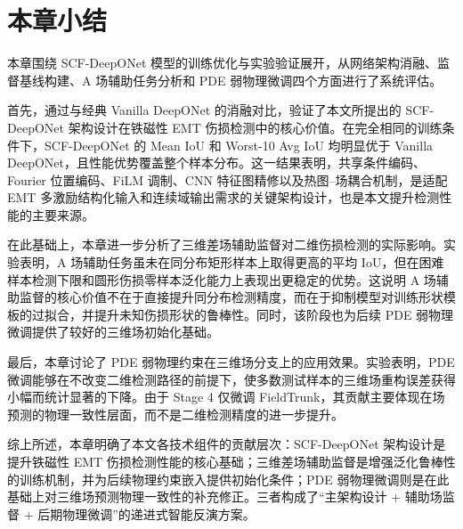 \section{本章小结}
\label{sec:ch4_conclusion}

本章围绕 SCF-DeepONet 模型的训练优化与实验验证展开，从网络架构消融、监督基线构建、A 场辅助任务分析和 PDE 弱物理微调四个方面进行了系统评估。

首先，通过与经典 Vanilla DeepONet 的消融对比，验证了本文所提出的 SCF-DeepONet 架构设计在铁磁性 EMT 伤损检测中的核心价值。在完全相同的训练条件下，SCF-DeepONet 的 Mean IoU 和 Worst-10 Avg IoU 均明显优于 Vanilla DeepONet，且性能优势覆盖整个样本分布。这一结果表明，共享条件编码、Fourier 位置编码、FiLM 调制、CNN 特征图精修以及热图--场耦合机制，是适配 EMT 多激励结构化输入和连续域输出需求的关键架构设计，也是本文提升检测性能的主要来源。

在此基础上，本章进一步分析了三维差场辅助监督对二维伤损检测的实际影响。实验表明，A 场辅助任务虽未在同分布矩形样本上取得更高的平均 IoU，但在困难样本检测下限和圆形伤损零样本泛化能力上表现出更稳定的优势。这说明 A 场辅助监督的核心价值不在于直接提升同分布检测精度，而在于抑制模型对训练形状模板的过拟合，并提升未知伤损形状的鲁棒性。同时，该阶段也为后续 PDE 弱物理微调提供了较好的三维场初始化基础。

最后，本章讨论了 PDE 弱物理约束在三维场分支上的应用效果。实验表明，PDE 微调能够在不改变二维检测路径的前提下，使多数测试样本的三维场重构误差获得小幅而统计显著的下降。由于 Stage 4 仅微调 FieldTrunk，其贡献主要体现在场预测的物理一致性层面，而不是二维检测精度的进一步提升。

综上所述，本章明确了本文各技术组件的贡献层次：SCF-DeepONet 架构设计是提升铁磁性 EMT 伤损检测性能的核心基础；三维差场辅助监督是增强泛化鲁棒性的训练机制，并为后续物理约束嵌入提供初始化条件；PDE 弱物理微调则是在此基础上对三维场预测物理一致性的补充修正。三者构成了``主架构设计 + 辅助场监督 + 后期物理微调''的递进式智能反演方案。